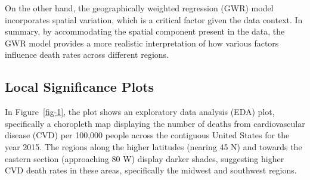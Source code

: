 \documentclass[
]{article}
\begin{document}
On the other hand, the geographically weighted regression (GWR) model
incorporates spatial variation, which is a critical factor given the
data context. In summary, by accommodating the spatial component present
in the data, the GWR model provides a more realistic interpretation of
how various factors influence death rates across different regions.

\begin{figure}


\caption{\label{fig-2}}

\end{figure}%

\subsection{Local Significance Plots}\label{local-significance-plots}

In Figure~\ref{fig-1}, the plot shows an exploratory data analysis (EDA)
plot, specifically a choropleth map displaying the number of deaths from
cardiovascular disease (CVD) per 100,000 people across the contiguous
United States for the year 2015. The regions along the higher latitudes
(nearing 45 N) and towards the eastern section (approaching 80 W)
display darker shades, suggesting higher CVD death rates in these areas,
specifically the midwest and southwest regions.~
\end{document}
